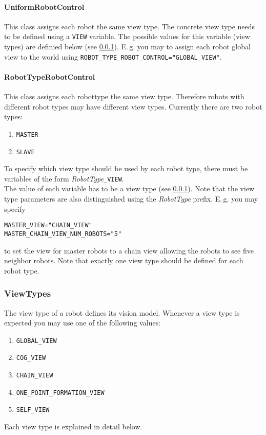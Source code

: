 \paragraph{UniformRobotControl}\label{sec:uniformRobotControl} This class assigns each robot the same view type. The concrete view type needs to be defined using a \texttt{VIEW} variable. The possible values for this variable (view types) are definied below (see \ref{sec:viewtypes}). E.\,g. you may to assign each robot global view to the world using \texttt{ROBOT\_TYPE\_ROBOT\_CONTROL="GLOBAL\_VIEW"}.

\paragraph{RobotTypeRobotControl}\label{sec:robotTypeRobotControl} This class assigns each robottype the same view type. Therefore robots with different robot types may have different view types. Currently there are two robot types:
\begin{enumerate}
	\item \texttt{MASTER}
	\item \texttt{SLAVE}
\end{enumerate}
To specify which view type should be used by each robot type, there must be variables of the form \textit{RobotType}\texttt{\_VIEW}. \\
The value of each variable has to be a view type (see \ref{sec:viewtypes}). Note that the view type parameters are also distinguished using the \textit{RobotType} prefix. E.\,g. you may specify 
\begin{center}
\texttt{MASTER\_VIEW="CHAIN\_VIEW"} \\
\texttt{MASTER\_CHAIN\_VIEW\_NUM\_ROBOTS="5"}
\end{center} to set the view for master robots to a chain view allowing the robots to see five neighbor robots. Note that exactly one view type should be defined for each robot type.

\subsubsection{ViewTypes}\label{sec:viewtypes}
The view type of a robot defines its vision model. Whenever a view type is expected you may use one of the following values:
\begin{enumerate}
	\item \texttt{GLOBAL\_VIEW}
	\item \texttt{COG\_VIEW}
	\item \texttt{CHAIN\_VIEW}
	\item \texttt{ONE\_POINT\_FORMATION\_VIEW}
	\item \texttt{SELF\_VIEW}
\end{enumerate}
Each view type is explained in detail below.

